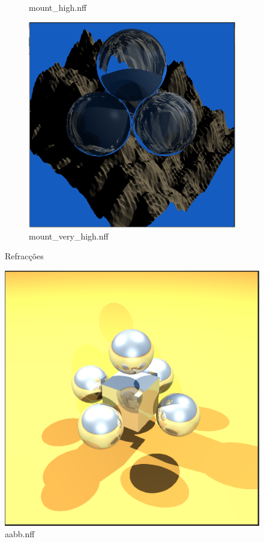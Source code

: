 \documentclass{article}
\begin{document}
\begin{figure}[h!]
\begin{subfigure}[b]{.2\linewidth}
            \caption{mount\_high.nff}
            \label{fig:mount_high}
        \end{subfigure}
        \begin{subfigure}[b]{.2\linewidth}
            \includegraphics[width=\linewidth]{mount_very_high.png}
            \caption{mount\_very\_high.nff}
            \label{fig:mount_very_high}
        \end{subfigure}

        \caption{Refracções}
        \label{fig:balls}
    \end{figure}

    \begin{figure}[h!]
        \centering
        \includegraphics[width=.2\linewidth]{aabb.png}
        \caption{aabb.nff}
        \label{fig:aabb}
    \end{figure}
\end{document}

